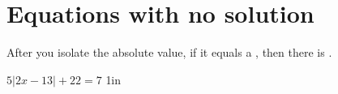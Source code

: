 \section{Equations with no solution}

\begin{tcolorbox}[center,width=5.75in,]
    After you isolate the absolute value,
    if it equals a ,
    then there is  .
\end{tcolorbox}

\myWideProblem
{
    $ 5|2x-13| + 22 = 7 $ 
}{1in}
